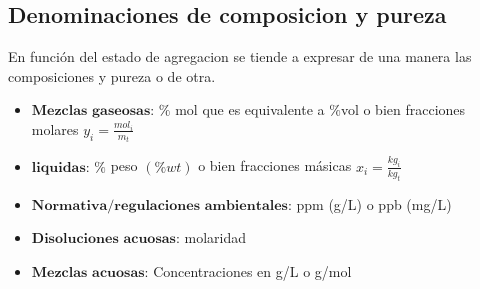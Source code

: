 \documentclass{report}
\begin{document}
\subsection{ Denominaciones de composicion y pureza}
\begin{raggedright}
	En función del estado de agregacion se tiende a expresar de una manera las composiciones y pureza o de otra.
	\begin{itemize}
		\item $\textbf{Mezclas gaseosas:}$ $\%$ mol que es equivalente a $\%$vol o bien fracciones molares $y_i =\frac{mol_i}{m_t}$
		\item $\textbf{liquidas:}$ $\%$ peso $(\%wt)$ o bien fracciones másicas $x_i = \frac{kg_i}{kg_t}$
		\item $\textbf{Normativa/regulaciones ambientales:}$ ppm (g/L) o ppb (mg/L)
		\item $\textbf{Disoluciones acuosas:}$ molaridad
		\item $\textbf{Mezclas acuosas:}$ Concentraciones en g/L o g/mol
	\end{itemize}
\end{raggedright}
\end{document}
